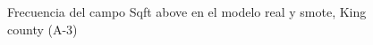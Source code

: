 \begin{figure}[H]
    \centering
    
    \caption{Frecuencia del campo Sqft above en el modelo real y smote, King county (A-3)}
    \label{frecuency-smote-sqft above}
\end{figure}